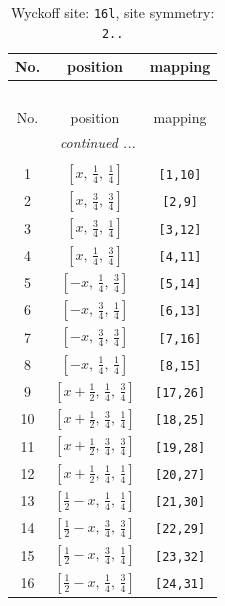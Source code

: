 \documentclass[fleqn,8pt]{jsarticle}
\begin{document}
\renewcommand{\arraystretch}{1.2}
\begin{longtable}{ccc}
\caption{Wyckoff site: {\tt 16l}, site symmetry: {\tt 2..}}
 \\
 \hline \hline
No. & position & mapping \\ \hline \endfirsthead

\multicolumn{2}{l}{\tablename\ \thetable{}} \\
 \hline \hline
No. & position & mapping \\ \hline \endhead

 \hline \hline
\multicolumn{2}{r}{\footnotesize\it continued ...} \\ \endfoot

 \hline \hline
\multicolumn{2}{r}{} \\ \endlastfoot

1 & $\left[ x,\, \frac{1}{4},\, \frac{1}{4} \right]$ & {\tt [1,10]} \\ \hline
2 & $\left[ x,\, \frac{3}{4},\, \frac{3}{4} \right]$ & {\tt [2,9]} \\ \hline
3 & $\left[ x,\, \frac{3}{4},\, \frac{1}{4} \right]$ & {\tt [3,12]} \\ \hline
4 & $\left[ x,\, \frac{1}{4},\, \frac{3}{4} \right]$ & {\tt [4,11]} \\ \hline
5 & $\left[ - x,\, \frac{1}{4},\, \frac{3}{4} \right]$ & {\tt [5,14]} \\ \hline
6 & $\left[ - x,\, \frac{3}{4},\, \frac{1}{4} \right]$ & {\tt [6,13]} \\ \hline
7 & $\left[ - x,\, \frac{3}{4},\, \frac{3}{4} \right]$ & {\tt [7,16]} \\ \hline
8 & $\left[ - x,\, \frac{1}{4},\, \frac{1}{4} \right]$ & {\tt [8,15]} \\ \hline
9 & $\left[ x + \frac{1}{2},\, \frac{1}{4},\, \frac{3}{4} \right]$ & {\tt [17,26]} \\ \hline
10 & $\left[ x + \frac{1}{2},\, \frac{3}{4},\, \frac{1}{4} \right]$ & {\tt [18,25]} \\ \hline
11 & $\left[ x + \frac{1}{2},\, \frac{3}{4},\, \frac{3}{4} \right]$ & {\tt [19,28]} \\ \hline
12 & $\left[ x + \frac{1}{2},\, \frac{1}{4},\, \frac{1}{4} \right]$ & {\tt [20,27]} \\ \hline
13 & $\left[ \frac{1}{2} - x,\, \frac{1}{4},\, \frac{1}{4} \right]$ & {\tt [21,30]} \\ \hline
14 & $\left[ \frac{1}{2} - x,\, \frac{3}{4},\, \frac{3}{4} \right]$ & {\tt [22,29]} \\ \hline
15 & $\left[ \frac{1}{2} - x,\, \frac{3}{4},\, \frac{1}{4} \right]$ & {\tt [23,32]} \\ \hline
16 & $\left[ \frac{1}{2} - x,\, \frac{1}{4},\, \frac{3}{4} \right]$ & {\tt [24,31]} \\
\end{longtable}
\end{document}
